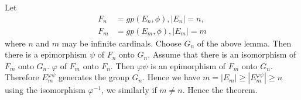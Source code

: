 \begin{proof of the theorem}
  Let 
  \begin{align*} 
    F_n &= gp(E_n, \phi), |E_n| =n,\\ 
    F_m &=gp(E_m, \phi), |E_m| =m 
  \end{align*}
  where $n$ and $m$ may be infinite cardinals. Choose $G_n$ of the
  above lemma. Then there is a epimorphism $\psi$ of $F_n$ onto
  $G_n$. Assume that there is an isomorphism of $F_m$ onto
  $G_n$. $\varphi$ of $F_m$ onto $F_n$. Then $\varphi \psi$ is an
  epimorphism of $F_m$ onto $G_n$.  Therefore $E_m^{\varphi \psi}$
  generates the group $G_n$. Hence we have $m=|E_m|\geq |E_m^{\varphi
    \psi}|\geq n$ using the isomorphism $\varphi^{-1}$, we similarly
  if $m \neq n$. Hence the theorem.  
\end{proof of the theorem}
 

